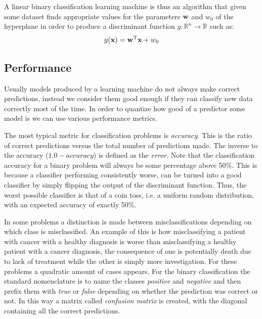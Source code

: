 A linear binary classification learning machine is thus an algorithm that given some dataset finds appropriate values for the parameters $\mathbf{w}$ and $w_0$ of the hyper\-plane in order to produce a discriminant function $y : \mathbb{R}^n \rightarrow \mathbb{R}$ such as:
\begin{align}
    y(\mathbf{x}) = \mathbf{w}^{\text{T}}\mathbf{x} + w_0
\end{align}

\subsection{Performance}
\label{sec:ch4.performance}

Usually models produced by a learning machine do not always make correct pre\-dict\-ions, instead we consider them good enough if they can classify new data correctly most of the time. In order to quantize how good of a predictor some model is we can use various performance metrics.

The most typical metric for classification problems is \emph{accuracy}. This is the ratio of correct predictions versus the total number of predictions made. The inverse to the accuracy ($1.0 - accuracy$) is defined as the \emph{error}. Note that the classification accuracy for a binary problem will always be some percentage above 50\%. This is because a classifier performing consistently worse, can be turned into a good classifier by simply flipping the output of the discriminant function. Thus, the worst possible classifier is that of a coin toss, i.e. a uniform random distribution, with an expected accuracy of exactly 50\%.

In some problems a distinction is made between misclassifications depending on which class is misclassified. An example of this is how misclassifying a patient with cancer with a healthy diagnosis is worse than misclassifying a healthy patient with a cancer diagnosis, the consequence of one is potentially death due to lack of treatment while the other is simply more investigation. For these problems a quadratic amount of cases appears. For the binary classification the standard nomenclature is to name the classes \emph{positive} and \emph{negative} and then prefix them with \emph{true} or \emph{false} depending on whether the prediction was correct or not. In this way a matrix called \emph{confusion matrix} is created, with the diagonal containing all the correct predictions.

